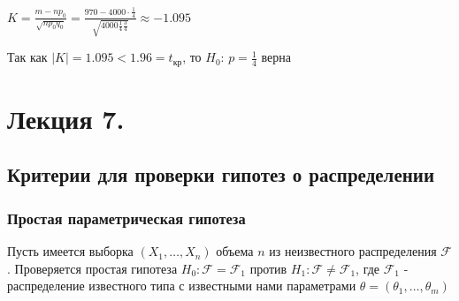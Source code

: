 \documentclass[12pt]{article}
\begin{document}
$K = \frac{m - np_0}{\sqrt{np_0 q_0}} = \frac{970 - 4000 \cdot \frac{1}{4}}{\sqrt{4000 \frac{1}{4} \frac{3}{4}}} \approx -1.095$

Так как $|K| = 1.095 < 1.96 = t_\text{кр}$, то $H_0: \, p = \frac{1}{4}$ верна






\section{Лекция 7.}

\subsection{Критерии для проверки гипотез о распределении}

\subsubsection{Простая параметрическая гипотеза}

Пусть имеется выборка $(X_1, \dots, X_n)$ объема $n$ из неизвестного распределения $\mathcal{F}$. 
Проверяется простая гипотеза $H_0 : \mathcal{F} = \mathcal{F}_1$ против $H_1 : \mathcal{F} \neq \mathcal{F}_1$, где $\mathcal{F}_1$ - распределение известного типа с 
известными нами параметрами $\theta = (\theta_1, \dots, \theta_m)$
\end{document}

